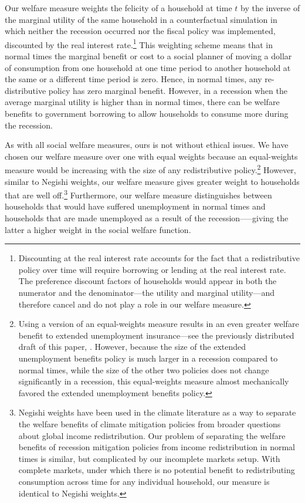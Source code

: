 Our welfare measure weights the felicity of a household at time $t$ by the inverse of the marginal utility of the same household in a counterfactual simulation in which neither the recession occurred nor the fiscal policy was implemented, discounted by the real interest rate.\footnote{Discounting at the real interest rate accounts for the fact that a redistributive policy over time will require borrowing or lending at the real interest rate.
The preference discount factors of households would appear in both the numerator and the denominator---the utility and marginal utility---and therefore cancel and do not play a role in our welfare measure.} This weighting scheme means that in normal times the marginal benefit or cost to a social planner of moving a dollar of consumption from one household at one time period to another household at the same or a different time period is zero.
Hence, in normal times, any re-distributive policy has zero marginal benefit.
However, in a recession when the average marginal utility is higher than in normal times, there can be welfare benefits to government borrowing to allow households to consume more during the recession.

As with all social welfare measures, ours is not without ethical issues.  We have chosen our welfare measure over one with equal weights because an equal-weights measure would be increasing with the size of any redistributive policy.\footnote{Using a version of an equal-weights measure results in an even greater welfare benefit to extended unemployment insurance---see the previously distributed draft of this paper, \cite{carroll2023welfare}.  However, because the size of the extended unemployment benefits policy is much larger in a recession compared to normal times, while the size of the other two policies does not change significantly in a recession, this equal-weights measure almost mechanically favored the extended unemployment benefits policy.}  However, similar to Negishi weights, our welfare measure gives greater weight to households that are well off.\footnote{Negishi weights have been used in the climate literature as a way to separate the welfare benefits of climate mitigation policies from broader questions about global income redistribution. Our problem of separating the welfare benefits of recession mitigation policies from income redistribution in normal times is similar, but complicated by our incomplete markets setup. With complete markets, under which there is no potential benefit to redistributing consumption across time for any individual household, our measure is identical to Negishi weights.}  Furthermore, our welfare measure distinguishes between households that would have suffered unemployment in normal times and households that are made unemployed as a result of the recession—--giving the latter a higher weight in the social welfare function.

